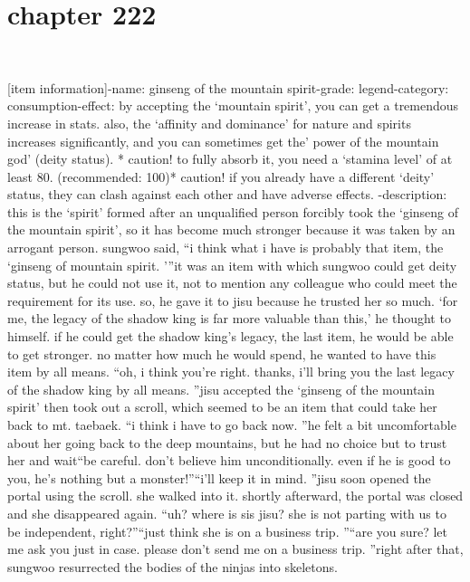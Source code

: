 \section{chapter 222}

                             




[item information]-name: ginseng of the mountain spirit-grade: legend-category: consumption-effect: by accepting the ‘mountain spirit’, you can get a tremendous increase in stats.
 also, the ‘affinity and dominance’ for nature and spirits increases significantly, and you can sometimes get the’ power of the mountain god’ (deity status).
* caution! to fully absorb it, you need a ‘stamina level’ of at least 80.
 (recommended: 100)* caution! if you already have a different ‘deity’ status, they can clash against each other and have adverse effects.
-description: this is the ‘spirit’ formed after an unqualified person forcibly took the ‘ginseng of the mountain spirit’, so it has become much stronger because it was taken by an arrogant person.
sungwoo said, “i think what i have is probably that item, the ‘ginseng of mountain spirit.
'”it was an item with which sungwoo could get deity status, but he could not use it, not to mention any colleague who could meet the requirement for its use.
so, he gave it to jisu because he trusted her so much.
‘for me, the legacy of the shadow king is far more valuable than this,’ he thought to himself.
if he could get the shadow king’s legacy, the last item, he would be able to get stronger.
 no matter how much he would spend, he wanted to have this item by all means.
“oh, i think you’re right.
 thanks, i’ll bring you the last legacy of the shadow king by all means.
”jisu accepted the ‘ginseng of the mountain spirit’ then took out a scroll, which seemed to be an item that could take her back to mt.
 taebaek.
“i think i have to go back now.
”he felt a bit uncomfortable about her going back to the deep mountains, but he had no choice but to trust her and wait“be careful.
 don’t believe him unconditionally.
 even if he is good to you, he’s nothing but a monster!”“i’ll keep it in mind.
”jisu soon opened the portal using the scroll.
 she walked into it.
 shortly afterward, the portal was closed and she disappeared again.
“uh? where is sis jisu? she is not parting with us to be independent, right?”“just think she is on a business trip.
”“are you sure? let me ask you just in case.
 please don’t send me on a business trip.
”right after that, sungwoo resurrected the bodies of the ninjas into skeletons.

